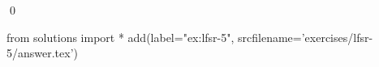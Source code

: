 
\begin{ex} 
  \label{ex:lfsr-5}
  
  \qed
\end{ex} 
\begin{python0}
from solutions import *
add(label="ex:lfsr-5",
    srcfilename='exercises/lfsr-5/answer.tex') 
\end{python0}
